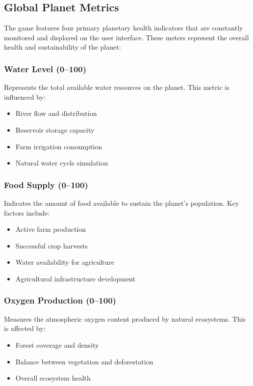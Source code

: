 \documentclass[12pt,a4paper]{article}
\begin{document}
\subsection{Global Planet Metrics}

The game features four primary planetary health indicators that are constantly monitored and displayed on the user interface. These meters represent the overall health and sustainability of the planet:

\subsubsection{Water Level (0--100)}

Represents the total available water resources on the planet. This metric is influenced by:
\begin{itemize}
    \item River flow and distribution
    \item Reservoir storage capacity
    \item Farm irrigation consumption
    \item Natural water cycle simulation
\end{itemize}

\subsubsection{Food Supply (0--100)}

Indicates the amount of food available to sustain the planet's population. Key factors include:
\begin{itemize}
    \item Active farm production
    \item Successful crop harvests
    \item Water availability for agriculture
    \item Agricultural infrastructure development
\end{itemize}

\subsubsection{Oxygen Production (0--100)}

Measures the atmospheric oxygen content produced by natural ecosystems. This is affected by:
\begin{itemize}
    \item Forest coverage and density
    \item Balance between vegetation and deforestation
    \item Overall ecosystem health
\end{itemize}
\end{document}

